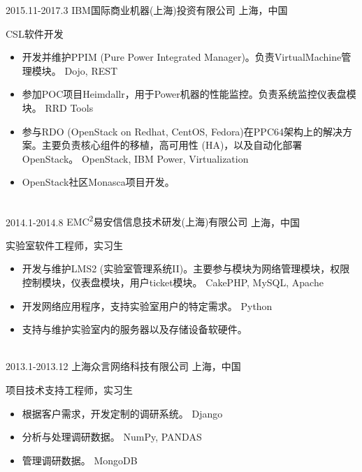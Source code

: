 \documentclass[]{friggeri-cv-cn} %
\begin{document}
\begin{entrylist}
	\entry
	{2015.11-2017.3}
	{IBM国际商业机器(上海)投资有限公司}
	{上海，中国}
	{CSL软件开发
		\begin{itemize}
			\item 开发并维护PPIM (Pure Power Integrated Manager)。负责VirtualMachine管理模块。{\footnotesize{} Dojo, REST}
			\item 参加POC项目Heimdallr，用于Power机器的性能监控。负责系统监控仪表盘模块。{\footnotesize{} RRD Tools}
			\item 参与RDO (OpenStack on Redhat, CentOS, Fedora)在PPC64架构上的解决方案。主要负责核心组件的移植，高可用性 (HA)，以及自动化部署OpenStack。{\footnotesize{} OpenStack, IBM Power, Virtualization}
			\item OpenStack社区Monasca项目开发。
		\end{itemize}
	}
\\
	\entry
	{2014.1-2014.8}
	{EMC\textsuperscript{2}易安信信息技术研发(上海)有限公司}
	{上海，中国}
	{实验室软件工程师，实习生
		\begin{itemize}
			\item 开发与维护LMS2 (实验室管理系统II)。主要参与模块为网络管理模块，权限控制模块，仪表盘模块，用户ticket模块。 {\footnotesize{} CakePHP, MySQL, Apache}
			\item 开发网络应用程序，支持实验室用户的特定需求。{\footnotesize{} Python}
			\item 支持与维护实验室内的服务器以及存储设备软硬件。
		\end{itemize}
	}
\\
	\entry
	{2013.1-2013.12}
	{上海众言网络科技有限公司}
	{上海，中国}
	{项目技术支持工程师，实习生
		\begin{itemize}
			\item 根据客户需求，开发定制的调研系统。{\footnotesize{} Django}
			\item 分析与处理调研数据。{\footnotesize{} NumPy, PANDAS}
			\item 管理调研数据。{\footnotesize{} MongoDB}
		\end{itemize}
	}
\end{entrylist}
\end{document}
